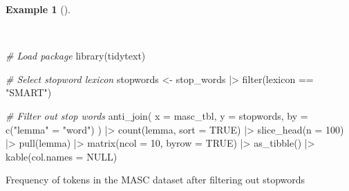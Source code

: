 \documentclass[
  letterpaper,
  DIV=11,
  numbers=noendperiod]{scrreport}
\newenvironment{Shaded}{\begin{snugshade}}{\end{snugshade}}
\newcommand{\AttributeTok}[1]{\textcolor[rgb]{0.00,0.00,0.00}{#1}}
\newcommand{\CommentTok}[1]{\textcolor[rgb]{0.00,0.00,0.00}{\textit{#1}}}
\newcommand{\ConstantTok}[1]{\textcolor[rgb]{0.00,0.00,0.00}{#1}}
\newcommand{\DecValTok}[1]{\textcolor[rgb]{0.00,0.00,0.00}{#1}}
\newcommand{\FunctionTok}[1]{\textcolor[rgb]{0.00,0.00,0.00}{#1}}
\newcommand{\NormalTok}[1]{\textcolor[rgb]{0.00,0.00,0.00}{#1}}
\newcommand{\OtherTok}[1]{\textcolor[rgb]{0.00,0.00,0.00}{#1}}
\newcommand{\SpecialCharTok}[1]{\textcolor[rgb]{0.00,0.00,0.00}{#1}}
\newcommand{\StringTok}[1]{\textcolor[rgb]{0.00,0.00,0.00}{#1}}
\theoremstyle{definition}
\newtheorem{example}{Example}[chapter]
\theoremstyle{remark}
\begin{document}
\begin{example}[]\protect\hypertarget{exm-eda-masc-count-stop-words}{}\label{exm-eda-masc-count-stop-words}

~

\begin{Shaded}
\begin{Highlighting}[]
\CommentTok{\# Load package}
\FunctionTok{library}\NormalTok{(tidytext)}

\CommentTok{\# Select stopword lexicon}
\NormalTok{stopwords }\OtherTok{\textless{}{-}} 
\NormalTok{  stop\_words }\SpecialCharTok{|\textgreater{}} 
  \FunctionTok{filter}\NormalTok{(lexicon }\SpecialCharTok{==} \StringTok{"SMART"}\NormalTok{)}

\CommentTok{\# Filter out stop words}
\FunctionTok{anti\_join}\NormalTok{(}
  \AttributeTok{x =}\NormalTok{ masc\_tbl,}
  \AttributeTok{y =}\NormalTok{ stopwords,}
  \AttributeTok{by =} \FunctionTok{c}\NormalTok{(}\StringTok{"lemma"} \OtherTok{=} \StringTok{"word"}\NormalTok{)}
\NormalTok{  ) }\SpecialCharTok{|\textgreater{}}
  \FunctionTok{count}\NormalTok{(lemma, }\AttributeTok{sort =} \ConstantTok{TRUE}\NormalTok{) }\SpecialCharTok{|\textgreater{}} 
  \FunctionTok{slice\_head}\NormalTok{(}\AttributeTok{n =} \DecValTok{100}\NormalTok{) }\SpecialCharTok{|\textgreater{}} 
  \FunctionTok{pull}\NormalTok{(lemma) }\SpecialCharTok{|\textgreater{}} 
  \FunctionTok{matrix}\NormalTok{(}\AttributeTok{ncol =} \DecValTok{10}\NormalTok{, }\AttributeTok{byrow =} \ConstantTok{TRUE}\NormalTok{) }\SpecialCharTok{|\textgreater{}}
  \FunctionTok{as\_tibble}\NormalTok{() }\SpecialCharTok{|\textgreater{}} 
  \FunctionTok{kable}\NormalTok{(}\AttributeTok{col.names =} \ConstantTok{NULL}\NormalTok{)}
\end{Highlighting}
\end{Shaded}

\hypertarget{tbl-eda-masc-count-stop-words}{}
\begin{table}
\caption{\label{tbl-eda-masc-count-stop-words}Frequency of tokens in the MASC dataset after filtering out stopwords }\tabularnewline


\end{table}
\end{example}
\end{document}
